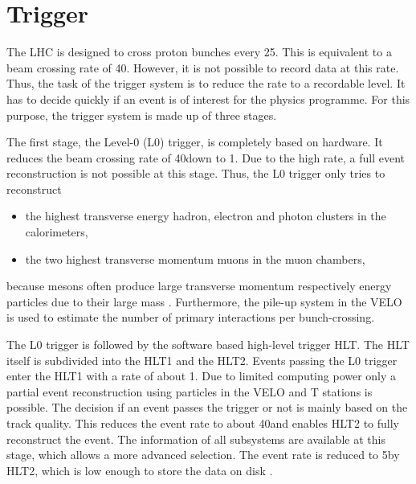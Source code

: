 \section{Trigger}
The LHC is designed to cross proton bunches every 25\ns.
This is equivalent to a beam crossing rate of 40\mhz.
However, it is not possible to record data at this rate.
Thus, the task of the \lhcb trigger system is to reduce the rate to a recordable level.
It has to decide quickly if an event is of interest for the \lhcb physics programme.
For this purpose, the trigger system is made up of three stages.

The first stage, the Level-0 (L0) trigger, is completely based on hardware.
It reduces the beam crossing rate of 40\mhz down to 1\mhz.
Due to the high rate, a full event reconstruction is not possible at this stage.
Thus, the L0 trigger only tries to reconstruct
\begin{itemize}
    \item the highest transverse energy \et hadron, electron and photon clusters in the calorimeters,
    \item the two highest transverse momentum muons in the muon chambers,
\end{itemize}
because \B mesons often produce large transverse momentum respectively energy particles due to their large mass \cite{detector}.
Furthermore, the pile-up system in the VELO is used to estimate the number of primary \proton\proton interactions per bunch-crossing.

The L0 trigger is followed by the software based high-level trigger HLT.
The HLT itself is subdivided into the HLT1 and the HLT2.
Events passing the L0 trigger enter the HLT1 with a rate of about 1\mhz.
Due to limited computing power only a partial event reconstruction using particles in the VELO and T stations is possible.
The decision if an event passes the trigger or not is mainly based on the track quality.
This reduces the event rate to about 40\khz and enables HLT2 to fully reconstruct the event.
The information of all \lhcb subsystems are available at this stage, which allows a more advanced selection.
The event rate is reduced to 5\khz by HLT2, which is low enough to store the data on disk \cite{detector, Trigger, Trigger_Performance_2011}.

